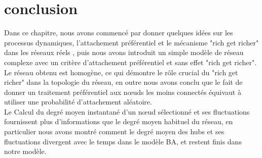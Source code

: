 \section{conclusion}

Dans ce chapitre, nous avons commencé par donner quelques idées sur les processus dynamiques, l'attachement préférentiel et le mécanisme "rich get richer" dans les réseaux réels , puis nous avons introduit un simple modèle de réseau complexe avec un critère d'attachement préférentiel et sans effet "rich get richer". Le réseau obtenu est homogène, ce qui démontre le rôle crucial du "rich get richer" dans la topologie du réseau, en outre nous avons conclu que le fait de donner un traitement préférentiel aux nœuds les moins connectés équivaut à utiliser une probabilité d'attachement aléatoire. \\
Le Calcul du degré moyen instantané d'un nœud sélectionné et ses fluctuations fournissent plus d'informations que le degré moyen habituel du réseau, en particulier nous avons montré comment le degré moyen des hubs et ses fluctuations divergent avec le temps dans le modèle BA, et restent finis dans notre modèle.
